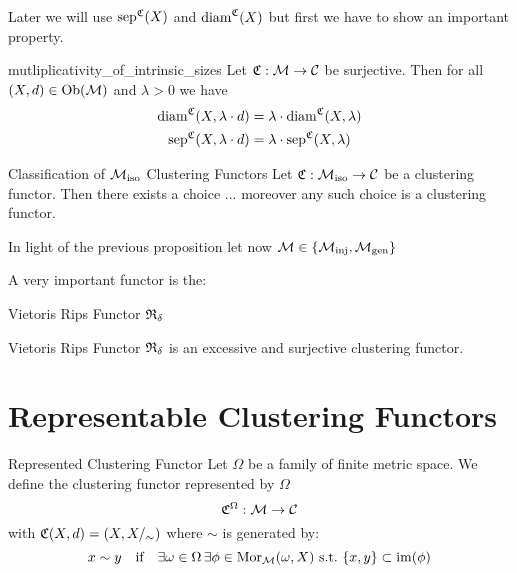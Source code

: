 Later we will use $\mathrm{sep}^{\mathfrak{C}}(X)$ and $\mathrm{diam}^{\mathfrak{C}}(X)$ but first we have to show an important property.

\begin{lemma}{}{mutliplicativity_of_intrinsic_sizes}
Let $\mathfrak{C}: \mathcal{M} \to \mathcal{C}$ be surjective. Then for all $(X,d) \in \mathrm {Ob}(\mathcal{M})$ and $\lambda > 0$ we have
\begin{align*}{}{}
    \mathrm{diam}^{\mathfrak{C}}(X,\lambda \cdot d) &= \lambda \cdot \mathrm{diam}^{\mathfrak{C}}(X,\lambda) \\
    \mathrm{sep}^{\mathfrak{C}}(X,\lambda \cdot d) &= \lambda \cdot \mathrm{sep}^{\mathfrak{C}}(X,\lambda)
\end{align*}
\end{lemma}

\begin{proposition}{Classification of ${\mathcal{M}_\mathrm{iso}}$ Clustering Functors}{}
Let $\mathfrak{C}: {\mathcal{M}_\mathrm{iso}} \to \mathcal{C}$ be a clustering functor. Then there exists a choice ... moreover any such choice is a clustering functor.
\end{proposition}
In light of the previous proposition let now $\mathcal{M} \in \{{\mathcal{M}_\mathrm{inj}}, {\mathcal{M}_\mathrm{gen}}\}$


A very important functor is the:
\begin{definition}{Vietoris Rips Functor}{}
$\mathfrak{R}_\delta$
\end{definition}




\begin{proposition}{Vietoris Rips Functor}{}
$\mathfrak{R}_\delta$ is an excessive and surjective clustering functor.
\end{proposition}

\section{Representable Clustering Functors}

\begin{definition}{Represented Clustering Functor}{}
Let $\Omega$ be a family of finite metric space. We define the clustering functor represented by $\Omega$
$$
\mathfrak{C}^\Omega: \mathcal{M} \to \mathcal{C}
$$
with $\mathfrak{C}(X,d) = (X, X/_\sim)$ where $\sim$ is generated by:
\begin{equation}
\label{eq:represented_clustering_functor_condition}
x \sim y \quad \text{if} \quad \exists \omega \in \Omega \,\exists \phi \in \mathrm {Mor}_{\mathcal{M}}(\omega, X) \ \text{s.t.} \ \{x,y\} \subset \operatorname*{im}(\phi)
\end{equation}
\end{definition}


